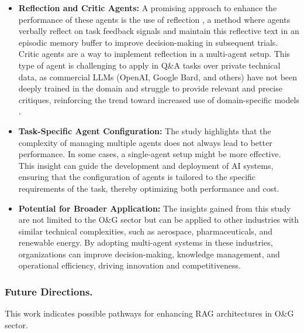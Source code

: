 \begin{itemize}
                    \item \textbf{Reflection and Critic Agents:}
                        A promising approach to enhance the performance of these agents is the use of reflection \citep{Shinn2023}, a method where agents verbally reflect on task feedback signals and maintain this reflective text in an episodic memory buffer to improve decision-making in subsequent trials. Critic agents are a way to implement reflection in a multi-agent setup. This type of agent is challenging to apply in Q\&A tasks over private technical data, as commercial LLMs (OpenAI, Google Bard, and others) have not been deeply trained in the domain and struggle to provide relevant and precise critiques, reinforcing the trend toward increased use of domain-specific models \citep{Shah2024, Meena2023, Ghosh2023}.                
                        
                    \item \textbf{Task-Specific Agent Configuration:}
                        The study highlights that the complexity of managing multiple agents does not always lead to better performance. In some cases, a single-agent setup might be more effective.
                        This insight can guide the development and deployment of AI systems, ensuring that the configuration of agents is tailored to the specific requirements of the task, thereby optimizing both performance and cost.           
                        
                    \item \textbf{Potential for Broader Application:}
                        The insights gained from this study are not limited to the O\&G sector but can be applied to other industries with similar technical complexities, such as aerospace, pharmaceuticals, and renewable energy.
                        By adopting multi-agent systems in these industries, organizations can improve decision-making, knowledge management, and operational efficiency, driving innovation and competitiveness.             
                    
                \end{itemize}
                        
                    
            \subsubsection{Future Directions.} 

                This work indicates possible pathways for enhancing RAG architectures in O\&G sector. 
                
